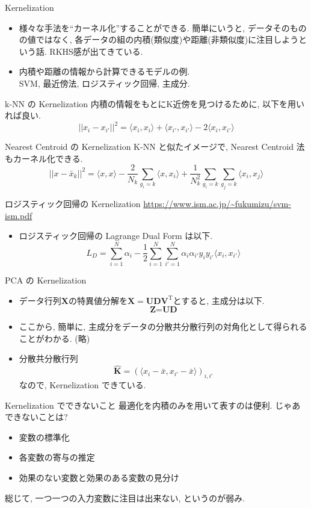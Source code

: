 \documentclass[dvipdfmx,8pt]{beamer}
\begin{document}
  \begin{frame}{Kernelization}
    \begin{itemize}
      \item 様々な手法を``カーネル化''することができる. 簡単にいうと, データそのものの値ではなく, 各データの組の内積(類似度)や距離(非類似度)に注目しようという話. RKHS感が出てきている.
      \item 内積や距離の情報から計算できるモデルの例.\\
        SVM, 最近傍法, ロジスティック回帰, 主成分.
    \end{itemize}
  \end{frame}
  \begin{frame}{k-NN の Kernelization}
    内積の情報をもとにK近傍を見つけるために, 以下を用いれば良い.
    \[
      ||x_i-x_{i'}||^2=\langle x_i,x_i\rangle+\langle x_{i'},x_{i'}\rangle-2\langle x_i,x_{i'}\rangle
    \]
  \end{frame}
  \begin{frame}{Nearest Centroid の Kernelization}
    K-NN と似たイメージで,  Nearest Centroid 法もカーネル化できる.
    \[
      ||x-\bar{x}_k||^2=\langle x,x\rangle-\frac{2}{N_k}\sum_{g_i=k}\langle x,x_i\rangle+\frac{1}{N_k^2}\sum_{g_i=k}\sum_{g_j=k}\langle x_i,x_j\rangle
    \]
  \end{frame}
  \begin{frame}{ロジスティック回帰の Kernelization}
    \url{https://www.ism.ac.jp/~fukumizu/svm-ism.pdf}
    \begin{itemize}
      \item ロジスティック回帰の Lagrange Dual Form は以下.
        \[
          L_D=\sum_{i=1}^N\alpha_i-\frac{1}{2}\sum_{i=1}^N\sum_{i'=1}^N\alpha_i\alpha_{i'}y_iy_{i'}\langle x_i,x_{i'}\rangle
        \]
    \end{itemize}
  \end{frame}
  \begin{frame}{PCA の Kernelization}
    \begin{itemize}
      \item データ行列$\textbf{X}$の特異値分解を$\textbf{X}=\textbf{UDV}^{\mathrm{T}}$とすると, 主成分は以下.
        \[
          \textbf{Z}=\textbf{UD}
        \]
      \item ここから, 簡単に, 主成分をデータの分散共分散行列の対角化として得られることがわかる. (略)
      \item 分散共分散行列
        \[
          \hat{\textbf{K}}=(\langle x_i-\bar{x}, x_{i'}-\bar{x}\rangle)_{i,i'}
        \]
        なので, Kernelization できている.
    \end{itemize}
  \end{frame}
  \begin{frame}{Kernelization でできないこと}
    最適化を内積のみを用いて表すのは便利. じゃあできないことは?
    \begin{itemize}
      \item 変数の標準化
      \item 各変数の寄与の推定
      \item 効果のない変数と効果のある変数の見分け
    \end{itemize}
    総じて, 一つ一つの入力変数に注目は出来ない, というのが弱み.
  \end{frame}
\end{document}

